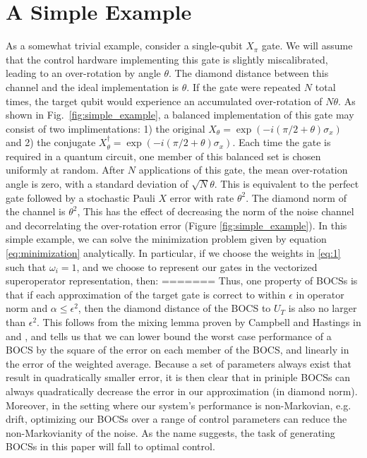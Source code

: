 \documentclass[aps,nofootinbib,pra,notitlepage,twocolumn]{revtex4-1}
\begin{document}
\section{A Simple Example}
As a somewhat trivial example, consider a single-qubit $X_\pi$ gate. We will assume that the control hardware implementing this gate is slightly miscalibrated, leading to an over-rotation by angle $\theta$. The diamond distance between this channel and the ideal implementation is $\theta$. If the gate were repeated $N$ total times, the target qubit would experience an accumulated over-rotation of $N\theta$. As shown in Fig.~\ref{fig:simple_example}, a balanced implementation of this gate may consist of two implimentations: 1) the original $X_\theta = \exp(-i (\pi/2+\theta)\sigma_x)$ and 2) the conjugate $X_\theta^\dagger = \exp(-i (\pi/2+\theta)\sigma_x)$. Each time the gate is required in a quantum circuit, one member of this balanced set is chosen uniformly at random. After $N$ applications of this gate, the mean over-rotation angle is zero, with a standard deviation of $\sqrt{N}\theta$. This is equivalent to the perfect gate followed by a stochastic Pauli $X$ error with rate $\theta^2$. The diamond norm of the channel is $\theta^2$, This has the effect of decreasing the norm of the noise channel and decorrelating the over-rotation error (Figure \ref{fig:simple_example}). In this simple example, we can solve the minimization problem given by equation \ref{eq:minimization} analytically. In particular, if we choose the weights in \ref{eq:1} such that $\omega_i=1$, and we choose to represent our gates in the vectorized superoperator representation, then:
=======
Thus, one property of BOCSs is that if each approximation of the target gate is correct to within $\epsilon$ in operator norm and $\alpha\leq\epsilon^2$, then the diamond distance of the BOCS to $U_T$ is also no larger than $\epsilon^2$. This follows from the mixing lemma proven by Campbell and Hastings in \cite{Campbell2017} and \cite{1612.01011}, and tells us that we can lower bound the worst case performance of a BOCS by the square of the error on each member of the BOCS, and linearly in the error of the weighted average. Because a set of parameters always exist that result in quadratically smaller error, it is then clear that in priniple BOCSs can always quadratically decrease the error in our approximation (in diamond norm). Moreover, in the setting where our system's performance is non-Markovian, e.g. drift, optimizing our BOCSs over a range of control parameters can reduce the non-Markovianity of the noise. As the name suggests, the task of generating BOCSs in this paper will fall to optimal control. 
\end{document}
